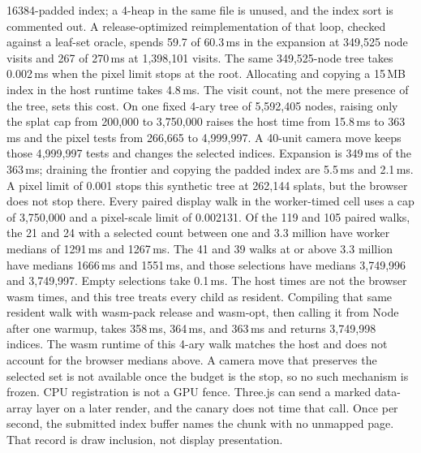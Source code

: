 \documentclass[sigconf,anonymous,review]{acmart}
\begin{document}
16384-padded index; a 4-heap in the same file is unused, and the index sort is commented out. A release-optimized reimplementation of that loop, checked against a leaf-set oracle, spends 59.7 of 60.3\,ms in the expansion at 349{,}525 node visits and 267 of 270\,ms at 1{,}398{,}101 visits. The same 349{,}525-node tree takes 0.002\,ms when the pixel limit stops at the root. Allocating and copying a 15\,MB index in the host runtime takes 4.8\,ms. The visit count, not the mere presence of the tree, sets this cost. On one fixed 4-ary tree of 5{,}592{,}405 nodes, raising only the splat cap from 200{,}000 to 3{,}750{,}000 raises the host time from 15.8\,ms to 363\,ms and the pixel tests from 266{,}665 to 4{,}999{,}997. A 40-unit camera move keeps those 4{,}999{,}997 tests and changes the selected indices. Expansion is 349\,ms of the 363\,ms; draining the frontier and copying the padded index are 5.5\,ms and 2.1\,ms. A pixel limit of 0.001 stops this synthetic tree at 262{,}144 splats, but the browser does not stop there. Every paired display walk in the worker-timed cell uses a cap of 3{,}750{,}000 and a pixel-scale limit of 0.002131. Of the 119 and 105 paired walks, the 21 and 24 with a selected count between one and 3.3 million have worker medians of 1291\,ms and 1267\,ms. The 41 and 39 walks at or above 3.3 million have medians 1666\,ms and 1551\,ms, and those selections have medians 3{,}749{,}996 and 3{,}749{,}997. Empty selections take 0.1\,ms. The host times are not the browser wasm times, and this tree treats every child as resident. Compiling that same resident walk with wasm-pack release and wasm-opt, then calling it from Node after one warmup, takes 358\,ms, 364\,ms, and 363\,ms and returns 3{,}749{,}998 indices. The wasm runtime of this 4-ary walk matches the host and does not account for the browser medians above. A camera move that preserves the selected set is not available once the budget is the stop, so no such mechanism is frozen. CPU registration is not a GPU fence. Three.js can send a marked data-array layer on a later render, and the canary does not time that call. Once per second, the submitted index buffer names the chunk with no unmapped page. That record is draw inclusion, not display presentation.
\end{document}
